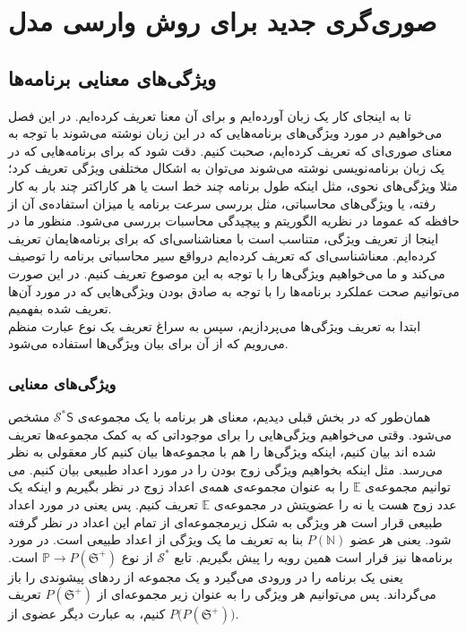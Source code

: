
\chapter{صوری‌گری جدید برای روش وارسی مدل}

\section{ویژگی‌های معنایی برنامه‌ها}
تا به اینجای کار یک زبان آورده‌ایم و برای آن معنا تعریف کرده‌ایم. در این فصل می‌خواهیم در مورد ویژگی‌های برنامه‌هایی که در این زبان نوشته می‌شوند با توجه به معنای صوری‌ای که تعریف کرده‌ایم، صحبت کنیم. دقت شود که برای برنامه‌هایی که در یک زبان برنامه‌نویسی نوشته می‌شوند می‌توان به اشکال مختلفی ویژگی تعریف کرد؛ مثلا ویژگی‌های نحوی، مثل اینکه طول برنامه چند خط است یا هر کاراکتر چند بار به کار رفته، یا ویژگی‌های محاسباتی، مثل بررسی‌ سرعت برنامه یا میزان استفاده‌ی آن از حافظه که عموما در نظریه الگوریتم و پیچیدگی محاسبات بررسی می‌شود. منظور ما در اینجا از تعریف ویژگی، متناسب است با معناشناسی‌ای که برای برنامه‌هایمان تعریف کرده‌ایم. معناشناسی‌ای که تعریف کرده‌ایم درواقع سیر محاسباتی برنامه را توصیف می‌کند و ما می‌خواهیم ویژگی‌ها را با توجه به این موصوع تعریف کنیم. در این صورت می‌توانیم صحت عملکرد برنامه‌ها را با توجه به صادق بودن ویژگی‌هایی که در مورد آن‌ها تعریف شده بفهمیم.\\
ابتدا به تعریف ویژگی‌ها می‌پردازیم، سپس به سراغ تعریف یک نوع عبارت منظم می‌رویم که از آن برای بیان ویژگی‌ها استفاده می‌شود.
\subsection{ویژگی‌های معنایی}
همان‌طور که در بخش قبلی دیدیم، معنای هر برنامه با یک مجموعه‌ی 
$\mathcal{S^*} {\mathsf{S}}$
مشخص می‌شود. وقتی می‌خواهیم ویژگی‌هایی را برای موجوداتی که به کمک مجموعه‌ها تعریف شده اند بیان کنیم، اینکه ویژگی‌ها را هم با مجموعه‌ها بیان کنیم کار معقولی به نظر می‌رسد. مثل اینکه بخواهیم ویژگی زوج بودن را در مورد اعداد طبیعی بیان کنیم. می توانیم مجموعه‌ی $\mathbb{E}$ را به عنوان مجموعه‌ی همه‌ی اعداد زوج در نظر بگیریم و اینکه یک عدد زوج هست یا نه را عضویتش در مجموعه‌ی $\mathbb{E}$ تعریف کنیم. پس یعنی در مورد اعداد طبیعی قرار است هر ویژگی به شکل زیرمجموعه‌ای از تمام این اعداد در نظر گرفته شود. یعنی هر عضو 
$\mathit{P}(\mathbb{N})$
بنا به تعریف ما یک ویژگی از اعداد طبیعی است.
در مورد برنامه‌ها نیز قرار است همین رویه را پیش بگیریم. تابع 
$\mathcal{S^*}$
از نوع 
$\mathbb{P} \rightarrow \mathit{P}(\mathfrak{S^+})$
است. یعنی یک برنامه را در ورودی می‌گیرد و یک مجموعه از ردهای پیشوندی را باز می‌گرداند. پس می‌توانیم هر ویژگی را به عنوان زیر مجموعه‌ای از 
$\mathit{P}(\mathfrak{S^+})$
تعریف کنیم، به عبارت دیگر عضوی از
$\mathit{P(P}(\mathfrak{S^+}))$.

